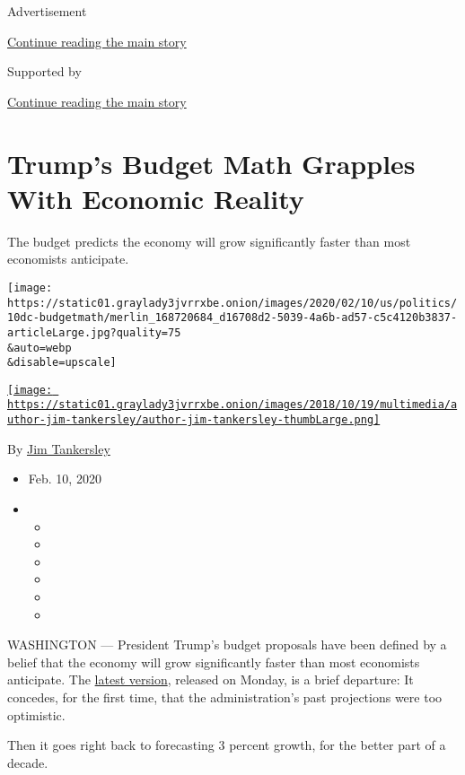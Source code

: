 Advertisement

\protect\hyperlink{after-top}{Continue reading the main story}

Supported by

\protect\hyperlink{after-sponsor}{Continue reading the main story}

\hypertarget{trumps-budget-math-grapples-with-economic-reality}{%
\section{Trump's Budget Math Grapples With Economic
Reality}\label{trumps-budget-math-grapples-with-economic-reality}}

The budget predicts the economy will grow significantly faster than most
economists anticipate.

\texttt{[image: https://static01.graylady3jvrrxbe.onion/images/2020/02/10/us/politics/10dc-budgetmath/merlin\_168720684\_d16708d2-5039-4a6b-ad57-c5c4120b3837-articleLarge.jpg?quality=75\\\&auto=webp\\\&disable=upscale]}

\href{https://www.nytimes3xbfgragh.onion/by/jim-tankersley}{\texttt{[image: https://static01.graylady3jvrrxbe.onion/images/2018/10/19/multimedia/author-jim-tankersley/author-jim-tankersley-thumbLarge.png]}}

By \href{https://www.nytimes3xbfgragh.onion/by/jim-tankersley}{Jim
Tankersley}

\begin{itemize}
\item
  Feb. 10, 2020
\item
  \begin{itemize}
  \item
  \item
  \item
  \item
  \item
  \item
  \end{itemize}
\end{itemize}

WASHINGTON --- President Trump's budget proposals have been defined by a
belief that the economy will grow significantly faster than most
economists anticipate. The
\href{https://www.nytimes3xbfgragh.onion/2020/02/09/us/politics/trump-border-wall-budget.html}{latest
version}, released on Monday, is a brief departure: It concedes, for the
first time, that the administration's past projections were too
optimistic.

Then it goes right back to forecasting 3 percent growth, for the better
part of a decade.

